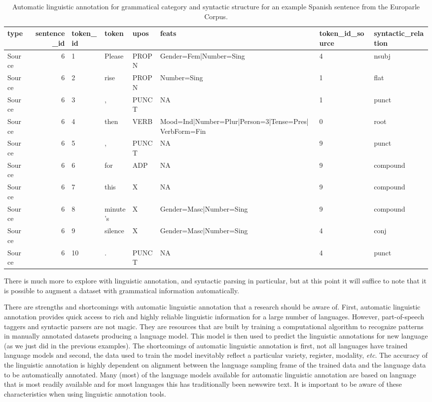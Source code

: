 \documentclass[
  letterpaper,
]{latex/krantz}
\begin{document}
\hypertarget{tbl-generation-europarle-es-example}{}
\begin{table}
\caption{\label{tbl-generation-europarle-es-example}Automatic linguistic annotation for grammatical category and syntactic
structure for an example Spanish sentence from the Europarle Corpus. }\tabularnewline

\centering
\begin{tabular}{lrllllll}
\toprule
type & sentence\_id & token\_id & token & upos & feats & token\_id\_source & syntactic\_relation\\
\midrule
Source & 6 & 1 & Please & PROPN & Gender=Fem|Number=Sing & 4 & nsubj\\
Source & 6 & 2 & rise & PROPN & Number=Sing & 1 & flat\\
Source & 6 & 3 & , & PUNCT & NA & 1 & punct\\
Source & 6 & 4 & then & VERB & Mood=Ind|Number=Plur|Person=3|Tense=Pres|VerbForm=Fin & 0 & root\\
Source & 6 & 5 & , & PUNCT & NA & 9 & punct\\
\addlinespace
Source & 6 & 6 & for & ADP & NA & 9 & compound\\
Source & 6 & 7 & this & X & NA & 9 & compound\\
Source & 6 & 8 & minute's & X & Gender=Masc|Number=Sing & 9 & compound\\
Source & 6 & 9 & silence & X & Gender=Masc|Number=Sing & 4 & conj\\
Source & 6 & 10 & . & PUNCT & NA & 4 & punct\\
\bottomrule
\end{tabular}
\end{table}

There is much more to explore with linguistic annotation, and syntactic
parsing in particular, but at this point it will suffice to note that it
is possible to augment a dataset with grammatical information
automatically.

There are strengths and shortcomings with automatic linguistic
annotation that a research should be aware of. First, automatic
linguistic annotation provides quick access to rich and highly reliable
linguistic information for a large number of languages. However,
part-of-speech taggers and syntactic parsers are not magic. They are
resources that are built by training a computational algorithm to
recognize patterns in manually annotated datasets producing a language
model. This model is then used to predict the linguistic annotations for
new language (as we just did in the previous examples). The shortcomings
of automatic linguistic annotation is first, not all languages have
trained language models and second, the data used to train the model
inevitably reflect a particular variety, register, modality, \emph{etc}.
The accuracy of the linguistic annotation is highly dependent on
alignment between the language sampling frame of the trained data and
the language data to be automatically annotated. Many (most) of the
language models available for automatic linguistic annotation are based
on language that is most readily available and for most languages this
has traditionally been newswire text. It is important to be aware of
these characteristics when using linguistic annotation tools.
\end{document}
